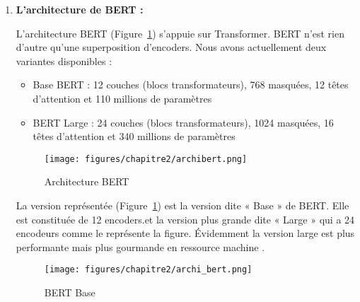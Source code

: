             \begin{enumerate}
            \setlength{\itemsep}{5pt}
                \item \textbf{L’architecture de BERT : }
                \par L'architecture BERT (Figure~\ref{fig:bert}) s’appuie sur Transformer. BERT n’est rien d’autre qu’une superposition d’encoders. Nous avons actuellement deux variantes disponibles :
                
                \begin{itemize}[label=•] 
                \setlength{\itemsep}{5pt}
                    \item Base BERT : 12 couches (blocs transformateurs), 768 masquées, 12 têtes d’attention et 110 millions de paramètres
                    
                    \item BERT Large : 24 couches (blocs transformateurs), 1024 masquées, 16 têtes d’attention et 340 millions de paramètres
                \end{itemize}
                
                \begin{figure}[H]
                	\begin{center}
                		\texttt{[image: figures/chapitre2/archibert.png]}
                	\end{center}
                	\caption {Architecture BERT}
                	\label{fig:bert}
                \end{figure}       
                
                \par La version représentée (Figure~\ref{fig:bert}) est la version dite « Base » de BERT. Elle est constituée de 12 encoders.et la version plus grande dite « Large » qui a 24 encodeurs comme le représente la figure. Évidemment la version large est plus performante mais plus gourmande en ressource machine \cite{ch2ref21,ch2ref20}.\\
                
                \begin{figure}[H]
                	\begin{center}
                    	\texttt{[image: figures/chapitre2/archi\_bert.png]}
                	\end{center}
                	\caption {BERT Base}
                	\label{fig:bertarchi}
                \end{figure} 
                

\end{enumerate}
